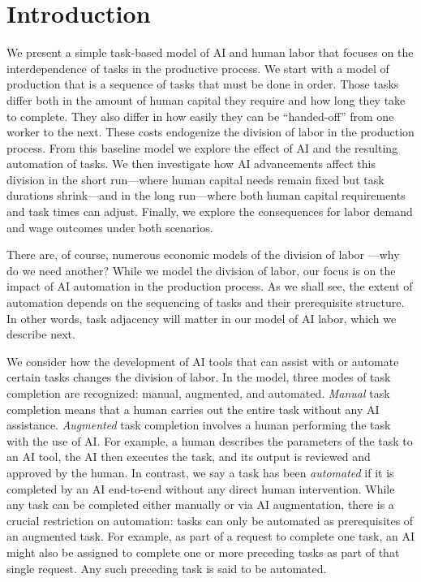 \documentclass{article}
\theoremstyle{plain}
\theoremstyle{plain}
\begin{document}
\onehalfspacing

\section{Introduction}
We present a simple task-based model of AI and human labor that focuses on the interdependence of tasks in the productive process.
We start with a model of production that is a sequence of tasks that must be done in order.
Those tasks differ both in the amount of human capital they require and how long they take to complete.
They also differ in how easily they can be ``handed-off'' from one worker to the next.
These costs endogenize the division of labor in the production process.  From this baseline model we explore the effect of AI and the resulting automation of tasks.
We then investigate how AI advancements affect this division in the short run---where human capital needs remain fixed but task durations shrink---and in the long run---where both human capital requirements and task times can adjust.
Finally, we explore the consequences for labor demand and wage outcomes under both scenarios.

There are, of course, numerous economic models of the division of labor \citep{becker1992division, deming2017growing}---why do we need another?
While we model the division of labor, our focus is on the impact of AI automation in the production process.  As we shall see, the extent of automation depends on the sequencing of tasks and their prerequisite structure.  In other words, task adjacency will matter in our model of AI labor, which we describe next.

We consider how the development of AI tools that can assist with or automate certain tasks changes the division of labor.  
In the model, three modes of task completion are recognized: manual, augmented, and automated.
\emph{Manual} task completion means that a human carries out the entire task without any AI assistance.  
\emph{Augmented} task completion involves a human performing the task with the use of AI.  For example, a human describes the parameters of the task to an AI tool, the AI then executes the task, and its output is reviewed and approved by the human.
In contrast, we say a task has been \emph{automated} if it is completed by an AI end-to-end without any direct human intervention.  While any task can be completed either manually or via AI augmentation, there is a crucial restriction on automation: tasks can only be automated as prerequisites of an augmented task.  For example, as part of a request to complete one task, an AI might also be assigned to complete one or more preceding tasks as part of that single request.  Any such preceding task is said to be automated.
\end{document}
